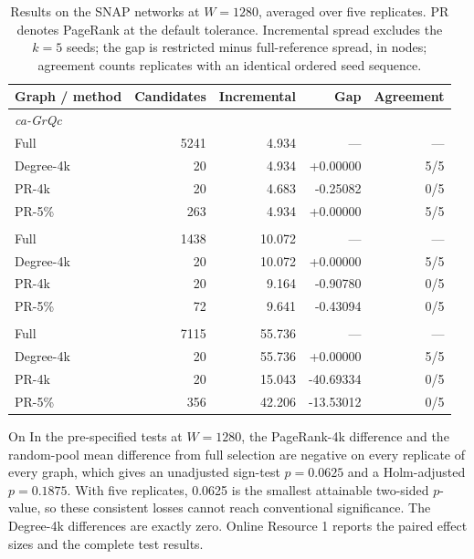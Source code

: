 \documentclass[smallextended]{svjour3}
\providecommand{\DIFaddtex}[1]{{\protect\color{blue} \sf #1}} %
\providecommand{\DIFdeltex}[1]{{\protect\color{red} \scriptsize #1}} %
\providecommand{\DIFaddbegin}{} %
\providecommand{\DIFaddend}{} %
\providecommand{\DIFdelbegin}{} %
\providecommand{\DIFdelend}{} %
\providecommand{\DIFadd}[1]{\texorpdfstring{\DIFaddtex{#1}}{#1}} %
\providecommand{\DIFdel}[1]{\texorpdfstring{\DIFdeltex{#1}}{}} %
\providecommand{\DIFscaledelfig}{0.5}
\newlength{\DIFdelgraphicswidth} %
\newlength{\DIFdelgraphicsheight} %
\providecommand{\DIFaddincludegraphics}[2][]{{\color{blue}\fbox{\DIFOincludegraphics[#1]{#2}}}} %
\providecommand{\DIFdelincludegraphics}[2][]{%
\sbox{\DIFdelgraphicsbox}{\DIFOincludegraphics[#1]{#2}}%
\settoboxwidth{\DIFdelgraphicswidth}{\DIFdelgraphicsbox} %
\settoboxtotalheight{\DIFdelgraphicsheight}{\DIFdelgraphicsbox} %
\scalebox{\DIFscaledelfig}{%
\parbox[b]{\DIFdelgraphicswidth}{\usebox{\DIFdelgraphicsbox}\\[-\baselineskip] \rule{\DIFdelgraphicswidth}{0em}}\llap{\resizebox{\DIFdelgraphicswidth}{\DIFdelgraphicsheight}{%
\setlength{\unitlength}{\DIFdelgraphicswidth}%
\begin{picture}(1,1)%
\thicklines\linethickness{2pt} %
{\color[rgb]{1,0,0}\put(0,0){\framebox(1,1){}}}%
{\color[rgb]{1,0,0}\put(0,0){\line( 1,1){1}}}%
{\color[rgb]{1,0,0}\put(0,1){\line(1,-1){1}}}%
\end{picture}%
}\hspace*{3pt}}} %
} %
\DeclareRobustCommand{\DIFaddbegin}{\DIFOaddbegin \let\includegraphics\DIFaddincludegraphics} %
\DeclareRobustCommand{\DIFaddend}{\DIFOaddend \let\includegraphics\DIFOincludegraphics} %
\DeclareRobustCommand{\DIFdelbegin}{\DIFOdelbegin \let\includegraphics\DIFdelincludegraphics} %
\DeclareRobustCommand{\DIFdelend}{\DIFOaddend \let\includegraphics\DIFOincludegraphics} %
\begin{document}
\DIFaddend \begin{table}[htbp]
\caption{Results on the SNAP networks at $W=1280$, averaged over five replicates. PR denotes PageRank at the default tolerance. Incremental spread excludes the $k=5$ seeds; the gap is restricted minus full-reference spread, in nodes; agreement counts replicates with an identical ordered seed sequence.}\label{tab:primary}
\centering\begin{tabular}{lrrrr}\toprule
Graph / method & Candidates & Incremental & Gap & Agreement \\ \midrule
\multicolumn{5}{l}{\textit{ca-GrQc}} \\
Full & 5241 & 4.934 & --- & --- \\
Degree-4k & 20 & 4.934 & +0.00000 & 5/5 \\
PR-4k & 20 & 4.683 & -0.25082 & 0/5 \\
PR-5\% & 263 & 4.934 & +0.00000 & 5/5 \\
\addlinespace
\multicolumn{5}{l}{\textit{CollegeMsg}} \\
Full & 1438 & 10.072 & --- & --- \\
Degree-4k & 20 & 10.072 & +0.00000 & 5/5 \\
PR-4k & 20 & 9.164 & -0.90780 & 0/5 \\
PR-5\% & 72 & 9.641 & -0.43094 & 0/5 \\
\addlinespace
\multicolumn{5}{l}{\textit{wiki-Vote}} \\
Full & 7115 & 55.736 & --- & --- \\
Degree-4k & 20 & 55.736 & +0.00000 & 5/5 \\
PR-4k & 20 & 15.043 & -40.69334 & 0/5 \\
PR-5\% & 356 & 42.206 & -13.53012 & 0/5 \\
\bottomrule\end{tabular}
\end{table}

\DIFdelbegin \DIFdel{On }\DIFdelend \DIFaddbegin \DIFadd{In the pre-specified tests at $W=1280$, the PageRank-4k difference and the random-pool mean difference from full selection are negative on every replicate of every graph, which gives an unadjusted sign-test $p=0.0625$ and a Holm-adjusted $p=0.1875$. With five replicates, 0.0625 is the smallest attainable two-sided $p$-value, so these consistent losses cannot reach conventional significance. The Degree-4k differences are exactly zero. Online Resource 1 reports the paired effect sizes and the complete test results.
}
\end{document}
